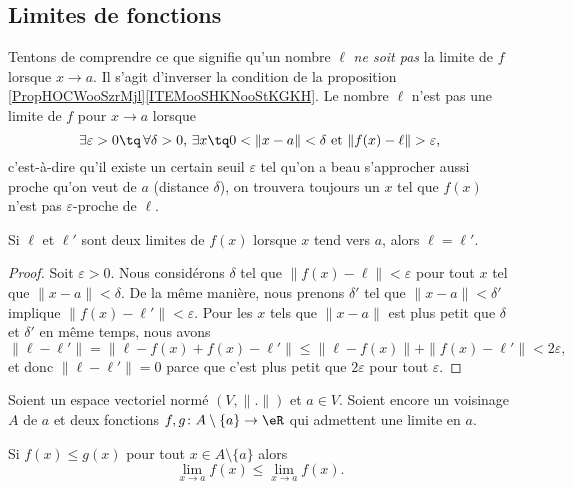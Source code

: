 \subsection{Limites de fonctions}

Tentons de comprendre ce que signifie qu'un nombre $\ell$ \emph{ne soit pas} la limite de $f$ lorsque $x\to a$. Il s'agit d'inverser la condition de la proposition \ref{PropHOCWooSzrMjl}\ref{ITEMooSHKNooStKGKH}. Le nombre $\ell$ n'est pas une limite de $f$ pour $x\to a$ lorsque
\begin{equation}		\label{EqCaractNonLim}
	\exists\varepsilon>0\tq\,\forall\delta>0,\,\exists x\tq 0<\| x-a \|<\delta\text{ et }\| f(x)-\ell \|>\varepsilon,
\end{equation}
c'est-à-dire qu'il existe un certain seuil $\varepsilon$ tel qu'on a beau s'approcher aussi proche qu'on veut de $a$ (distance $\delta$), on trouvera toujours un $x$ tel que $f(x)$ n'est pas $\varepsilon$-proche de $\ell$.

\begin{lemma}
	Si $\ell$ et $\ell'$ sont deux limites de $f(x)$ lorsque $x$ tend vers $a$, alors $\ell=\ell'$.
\end{lemma}

\begin{proof}
	Soit $\varepsilon>0$. Nous considérons $\delta$ tel que $\| f(x)-\ell \|<\varepsilon$ pour tout $x$ tel que $\| x-a \|<\delta$. De la même manière, nous prenons $\delta'$ tel que $\| x-a \|<\delta'$ implique $\| f(x)-\ell' \|<\varepsilon$. Pour les $x$ tels que $\| x-a \|$ est plus petit que $\delta$ et $\delta'$ en même temps, nous avons
	\begin{equation}
		\| \ell-\ell' \|=\| \ell-f(x)+f(x)-\ell' \|\leq\| \ell-f(x) \|+\| f(x)-\ell' \|<2\varepsilon,
	\end{equation}
	et donc $\| \ell-\ell' \|=0$ parce que c'est plus petit que $2\varepsilon$ pour tout $\varepsilon$.
\end{proof}

\begin{proposition}  \label{PROPooKPOXooEHIXJs}
    Soient un espace vectoriel normé \( (V,\| . \|)\) et \( a\in V\). Soient encore un voisinage \( A\) de \( a\) et deux fonctions \( f,g\colon A\setminus \{ a \}\to \eR\) qui admettent une limite en \( a\). 

    Si \( f(x)\leq g(x)\) pour tout \( x\in A\setminus \{ a \}\) alors 
    \begin{equation}
        \lim_{x\to a} f(x)\leq \lim_{x\to a}f(x).
    \end{equation}
\end{proposition}

